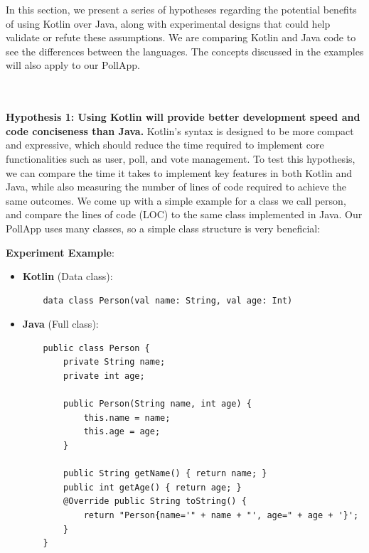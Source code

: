 In this section, we present a series of hypotheses regarding the potential benefits of using Kotlin over Java, along with experimental designs that could help validate or refute these assumptions. We are comparing Kotlin and Java code to see the differences between the languages. The concepts discussed in the examples will also apply to our PollApp.

\\
\\
\textbf{Hypothesis 1: Using Kotlin will provide better development speed and code conciseness than Java.} Kotlin’s syntax is designed to be more compact and expressive, which should reduce the time required to implement core functionalities such as user, poll, and vote management. To test this hypothesis, we can compare the time it takes to implement key features in both Kotlin and Java, while also measuring the number of lines of code required to achieve the same outcomes. We come up with a simple example for a class we call person, and compare the lines of code (LOC) to the same class implemented in Java. Our PollApp uses many classes, so a simple class structure is very beneficial:

\textbf{Experiment Example}:
\begin{itemize}
    \item \textbf{Kotlin} (Data class):
    \begin{verbatim}
    data class Person(val name: String, val age: Int)
    \end{verbatim}
    
    \item \textbf{Java} (Full class):
    \begin{verbatim}
    public class Person {
        private String name;
        private int age;

        public Person(String name, int age) {
            this.name = name;
            this.age = age;
        }

        public String getName() { return name; }
        public int getAge() { return age; }
        @Override public String toString() { 
   	        return "Person{name='" + name + "', age=" + age + '}'; 
        }
    }
    \end{verbatim}
\end{itemize}

